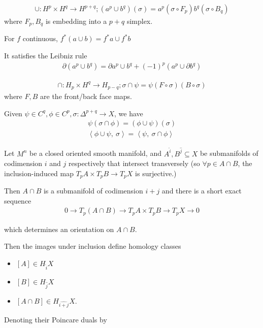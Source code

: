 \begin{align*}
\cup: H^p \times H^q \to H^{p+q}; (a^p \cup b^q)(\sigma) = a^p(\sigma \circ F_p) b^q(\sigma \circ B_q)
\end{align*}
where \(F_p, B_q\) is embedding into a \(p+q\) simplex.

For \(f\) continuous, \(f^*(a\cup b) = f^*a \cup f^*b\)

It satisfies the Leibniz rule
\begin{align*}{\partial}(a^p \cup b^q) = {\partial}a^p \cup b^q + (-1)^p(a^p\cup {\partial}b^q)\end{align*}

\begin{align*}
\cap: H_p \times H^q \to H_{p-q}; \sigma \cap \psi = \psi(F\circ\sigma)(B\circ \sigma)
\end{align*}
where \(F,B\) are the front/back face maps.

Given \(\psi \in C^q, \phi \in C^p, \sigma: \Delta^{p+q} \to X\), we
have
\begin{align*}
\psi(\sigma \cap \phi) = (\phi \cup \psi)(\sigma)\\
{\left\langle {\phi\cup \psi},~{\sigma} \right\rangle} = {\left\langle {\psi},~{\sigma \cap \phi} \right\rangle}
\end{align*}

Let \(M^n\) be a closed oriented smooth manifold, and
\(A^{\widehat{i}}, B^{\widehat{j}} \subseteq X\) be submanifolds of
codimension \(i\) and \(j\) respectively that intersect transversely (so
\(\forall p\in A\cap B\), the inclusion-induced map
\(T_pA \times T_p B \to T_p X\) is surjective.)

Then \(A\cap B\) is a submanifold of codimension \(i+j\) and there is a
short exact sequence
\begin{align*}
0 \to T_p(A\cap B) \to T_p A \times T_p B \to T_p X \to 0
\end{align*}

which determines an orientation on \(A\cap B\).

Then the images under inclusion define homology classes

\begin{itemize}
\tightlist
\item
  \([A] \in H_{\widehat{i}}X\)
\item
  \([B] \in H_{\widehat{j}}X\)
\item
  \([A\cap B] \in H_{\widehat{i+j}}X\).
\end{itemize}

Denoting their Poincare duals by


